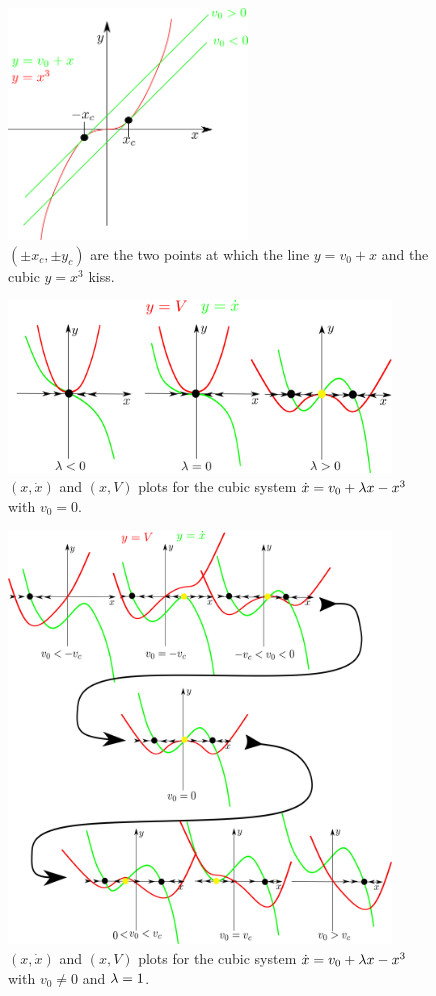 \begin{figure}[h!]
\centering
\includegraphics[width=2.5in]
{dynamical-sys/geometrical-v-critical.png}
\caption{$(\pm x_c, \pm y_c)$
are the two points at which 
the line
$y=v_0 + x$ and the cubic
$y=x^3$
kiss.
}
\label{fig-geometrical-v-critical-v0}
\end{figure}


\begin{figure}[h!]
\centering
\includegraphics[width=4in]
{dynamical-sys/phase-V-cubic-zero-v0.png}
\caption{$(x, \dot{x})$ and $(x, V)$ plots for the cubic system
$\dot{x}=v_0 + \lambda x-x^3$ with $v_0=0$.}
\label{fig-phase-V-cubic-zero-v0}
\end{figure}

\begin{figure}[h!]
\centering
\includegraphics[width=4in]
{dynamical-sys/phase-V-cubic-with-v0.png}
\caption{$(x, \dot{x})$ and $(x, V)$ plots for the cubic system
$\dot{x}=v_0 + \lambda x-x^3$ with $v_0\neq 0$
and $\lambda=1$.}
\label{fig-phase-V-cubic-with-v0}
\end{figure}

